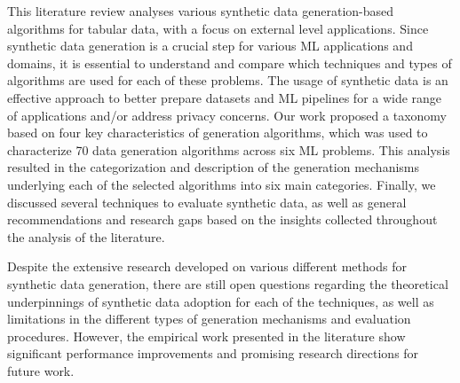 This literature review analyses various synthetic data generation-based
algorithms for tabular data, with a focus on external level applications.
Since synthetic data generation is a crucial step for various ML applications
and domains, it is essential to understand and compare which techniques and
types of algorithms are used for each of these problems. The usage of
synthetic data is an effective approach to better prepare datasets and ML
pipelines for a wide range of applications and/or address privacy concerns.
Our work proposed a taxonomy based on four key characteristics of generation
algorithms, which was used to characterize 70 data generation algorithms
across six ML problems. This analysis resulted in the categorization and
description of the generation mechanisms underlying each of the selected
algorithms into six main categories. Finally, we discussed several techniques
to evaluate synthetic data, as well as general recommendations and research
gaps based on the insights collected throughout the analysis of the
literature.

Despite the extensive research developed on various different methods for
synthetic data generation, there are still open questions regarding the
theoretical underpinnings of synthetic data adoption for each of the
techniques, as well as limitations in the different types of generation
mechanisms and evaluation procedures. However, the empirical work presented in
the literature show significant performance improvements and promising
research directions for future work.
